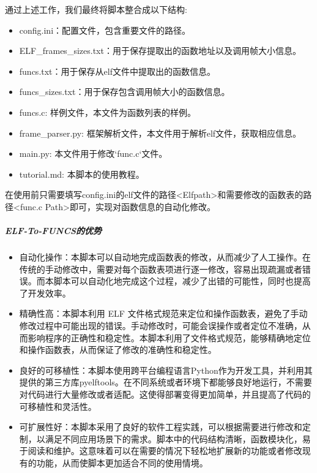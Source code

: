 \documentclass[12pt,a4paper]{ctexart}
\numberwithin{figure}{section}
\begin{document}
\par 通过上述工作，我们最终将脚本整合成以下结构:
\begin{itemize}
    \item config.ini：配置文件，包含重要文件的路径。
    \item ELF\_frames\_sizes.txt：用于保存提取出的函数地址以及调用帧大小信息。
    \item funcs.txt：用于保存从elf文件中提取出的函数信息。
    \item funcs\_sizes.txt：用于保存包含调用帧大小的函数信息。
    \item funcs.c: 样例文件，本文件为函数列表的样例。
    \item frame\_parser.py: 框架解析文件，本文件用于解析elf文件，获取相应信息。
    \item main.py: 本文件用于修改`func.c`文件。
    \item tutorial.md: 本脚本的使用教程。
\end{itemize}
\par 在使用前只需要填写config.ini的elf文件的路径<Elfpath>和需要修改的函数表的路径<func.c Path>即可，实现对函数信息的自动化修改。



\subparagraph{ELF-To-FUNCS的优势}
\begin{itemize}
    \item 自动化操作：本脚本可以自动地完成函数表的修改，从而减少了人工操作。在传统的手动修改中，需要对每个函数表项进行逐一修改，容易出现疏漏或者错误。而本脚本可以自动化地完成这个过程，减少了出错的可能性，同时也提高了开发效率。
    \item 精确性高：本脚本利用 ELF 文件格式规范来定位和操作函数表，避免了手动修改过程中可能出现的错误。手动修改时，可能会误操作或者定位不准确，从而影响程序的正确性和稳定性。本脚本利用了文件格式规范，能够精确地定位和操作函数表，从而保证了修改的准确性和稳定性。
    \item 良好的可移植性：本脚本使用跨平台编程语言Python作为开发工具，并利用其提供的第三方库pyelftools。在不同系统或者环境下都能够良好地运行，不需要对代码进行大量修改或者适配。这使得部署变得更加简单，并且提高了代码的可移植性和灵活性。
    \item 可扩展性好：本脚本采用了良好的软件工程实践，可以根据需要进行修改和定制，以满足不同应用场景下的需求。脚本中的代码结构清晰，函数模块化，易于阅读和维护。这意味着可以在需要的情况下轻松地扩展新的功能或者修改现有的功能，从而使脚本更加适合不同的使用情境。
\end{itemize}
\end{document}
